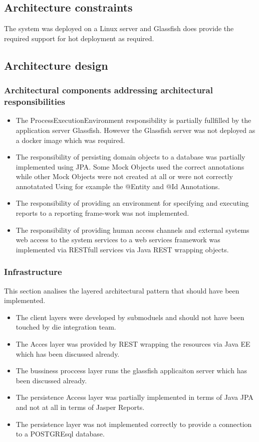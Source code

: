\documentclass[a4paper,10pt]{article}
\begin{document}
\subsection{Architecture constraints}
The system was deployed on a Linux server and Glassfish does provide the required support for hot deployment as required.

\subsection{Architecture design}
\subsubsection{Architectural components addressing architectural responsibilities}
\begin{itemize}
	\item The ProcessExecutionEnvironment responsibility is partially fullfilled by the application server Glassfish. However the Glassfish server was not deployed as a docker image which was required.
	\item The responsibility of persisting domain objects to a database was partially implemented using JPA. Some Mock Objects used the correct annotations
	while other Mock Objects were not created at all or were not correctly annotatated Using for example the @Entity and @Id Annotations.
	\item The responsibility of providing an environment for specifying and executing reports to a reporting frame-work was not implemented.
	\item The responsibility of providing human access channels and external systems web access to the system services to a web services framework was
	implemented via RESTfull services via Java REST wrapping objects.
\end{itemize}

\subsubsection{Infrastructure}
This section analises the layered architectural pattern that should have been implemented.
\begin{itemize}
	\item The client layers were developed by submoduels and should not have been touched by die integration team.
	\item The Acces layer was provided by REST wrapping the resources via Java EE which has been discussed already.
	\item The bussiness proccess layer runs the glassfish applicaiton server which has been discussed already.
	\item The persistence Access layer was partially implemented in terms of Java JPA and not at all in terms of Jasper Reports.
	\item The persistence layer was not implemented correctly to provide a connection to a POSTGREsql database.
\end{itemize}
\end{document}
